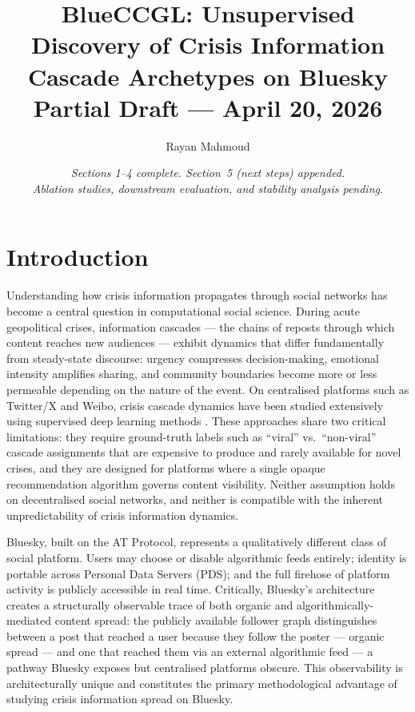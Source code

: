 \documentclass[12pt, a4paper]{article}
\title{%
  \textbf{BlueCCGL: Unsupervised Discovery of Crisis Information\\
  Cascade Archetypes on Bluesky}\\[0.5em]
  \large Partial Draft --- April 20, 2026
}
\author{Rayan Mahmoud}
\date{%
  \small\textit{Sections 1--4 complete. Section~5 (next steps) appended.\\
  Ablation studies, downstream evaluation, and stability analysis pending.}
}
\begin{document}
\maketitle
\tableofcontents
\newpage

\section{Introduction}
\label{sec:intro}

Understanding how crisis information propagates through social networks has become a central question in computational social science. During acute geopolitical crises, information cascades --- the chains of reposts through which content reaches new audiences --- exhibit dynamics that differ fundamentally from steady-state discourse: urgency compresses decision-making, emotional intensity amplifies sharing, and community boundaries become more or less permeable depending on the nature of the event. On centralised platforms such as Twitter/X and Weibo, crisis cascade dynamics have been studied extensively using supervised deep learning methods \citep{chen2019cascn, cao2017deephawkes, yuan2024casflow}. These approaches share two critical limitations: they require ground-truth labels such as ``viral'' vs.\ ``non-viral'' cascade assignments that are expensive to produce and rarely available for novel crises, and they are designed for platforms where a single opaque recommendation algorithm governs content visibility. Neither assumption holds on decentralised social networks, and neither is compatible with the inherent unpredictability of crisis information dynamics.

Bluesky, built on the AT Protocol, represents a qualitatively different class of social platform. Users may choose or disable algorithmic feeds entirely; identity is portable across Personal Data Servers (PDS); and the full firehose of platform activity is publicly accessible in real time. Critically, Bluesky's architecture creates a structurally observable trace of both organic and algorithmically-mediated content spread: the publicly available follower graph distinguishes between a post that reached a user because they follow the poster --- organic spread --- and one that reached them via an external algorithmic feed --- a pathway Bluesky exposes but centralised platforms obscure. This observability is architecturally unique and constitutes the primary methodological advantage of studying crisis information spread on Bluesky.
\end{document}
